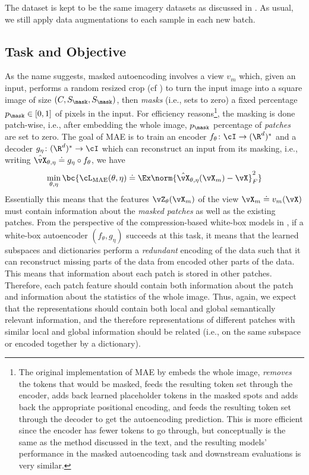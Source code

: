 \documentclass[../../book-main.tex]{subfiles}
\begin{document}
The dataset is kept to be the same imagery datasets as discussed in . As usual, we still apply data augmentations to each sample in each new batch. 

\subsection{Task and Objective}\label{sub:image_completion_objective}

As the name suggests, masked autoencoding involves a view \(v_{m}\) which, given an input, performs a random resized crop (cf ) to turn the input image into a square image of size \((C, S_{\mask}, S_{\mask})\), then \textit{masks} (i.e., sets to zero) a fixed percentage \(p_{\mask} \in [0, 1]\) of pixels in the input. For efficiency reasons\footnote{The original implementation of MAE by \cite{he2022masked} embeds the whole image, \textit{removes} the tokens that would be masked, feeds the resulting token set through the encoder, adds back learned placeholder tokens in the masked spots and adds back the appropriate positional encoding, and feeds the resulting token set through the decoder to get the autoencoding prediction. This is more efficient since the encoder has fewer tokens to go through, but conceptually is the same as the method discussed in the text, and the resulting models' performance in the masked autoencoding task and downstream evaluations is very similar.}, the masking is done patch-wise, i.e.,  after embedding the whole image, \(p_{\mask}\) percentage of \textit{patches} are set to zero. The goal of MAE is to train an encoder \(f_{\theta} \colon \cI \to (\R^{d})^{*}\) and a decoder \(g_{\eta} \colon (\R^{d})^{*} \to \cI\) which can reconstruct an input from its masking, i.e., writing \(\hat{\vX}_{\theta, \eta} \doteq g_{\eta} \circ f_{\theta}\), we have
\begin{equation}
    \min_{\theta, \eta}\bc{\cL_{\mathrm{MAE}}(\theta, \eta) \doteq \Ex\norm{\hat{\vX}_{\theta, \eta}(\vX_{m}) - \vX}_{F}^{2}}
\end{equation}
Essentially this means that the features \(\vZ_{\theta}(\vX_{m})\) of the view \(\vX_{m} \doteq v_{m}(\vX)\) must contain information about the \textit{masked patches} as well as the existing patches. From the perspective of the compression-based white-box models in , if a white-box autoencoder  \((f_{\theta}, g_{\eta})\) succeeds at this task, it means that the learned subspaces and dictionaries perform a \textit{redundant} encoding of the data such that it can reconstruct missing parts of the data from encoded other parts of the data. This means that information about each patch is stored in other patches. Therefore, each patch feature should contain both information about the patch and information about the statistics of the whole image. Thus, again, we expect that the representations should contain both local and global semantically relevant information, and the therefore representations of different patches with similar local and global information should be related (i.e., on the same subspace or encoded together by a dictionary).
\end{document}
